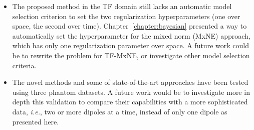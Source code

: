 \begin{itemize}
\item The proposed method in the TF domain still lacks an automatic model selection criterion to set the two regularization hyperparameters (one over space, the second over time). Chapter~\ref{chapter:bayesian} presented a way to automatically set the hyperparameter for the mixed norm (MxNE) approach, which has only one regularization parameter over space. A future work could be to rewrite the problem for TF-MxNE, or investigate other model selection criteria.

\item The novel methods and some of state-of-the-art approaches have been tested using three phantom datasets. A future work would be to investigate more in depth this validation to compare their capabilities with a more sophisticated data, \textit{i.e.}, two or more dipoles at a time, instead of only one dipole as presented here.

\end{itemize}

\cleardoublepage